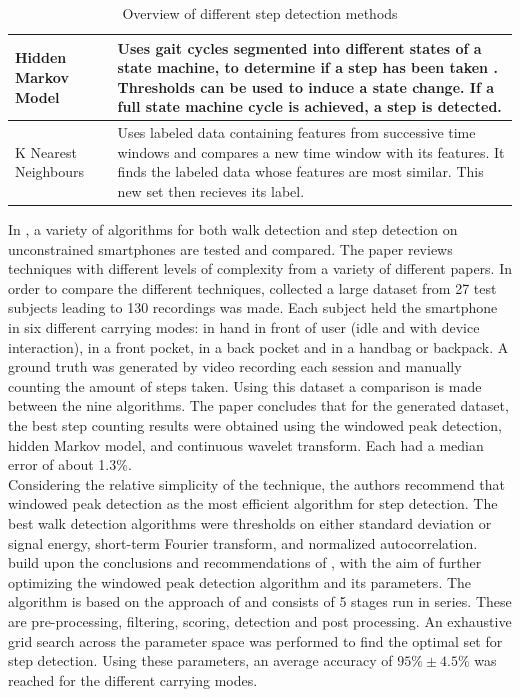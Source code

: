 \begin{table}
\begin{tabularx}{\linewidth}{@{} P{17mm} L}
		Hidden Markov Model & Uses gait cycles segmented into different states of a state machine, to determine if a step has been taken \cite{Ren2016a}. Thresholds can be used to induce a state change. If a full state machine cycle is achieved, a step is detected.\\ \hline
		K Nearest Neighbours & Uses labeled data containing features from successive time windows and compares a new time window with its features. It finds the labeled data whose features are most similar. This new set then recieves its label. \\
		\bottomrule
	\end{tabularx}
	\caption{Overview of different step detection methods}
	\label{tab:step_detection_comparison}
\end{table}

In \cite{Brajdic2013}, a variety of algorithms for both walk detection and step detection on unconstrained smartphones are tested and compared. The paper reviews techniques with different levels of complexity from a variety of different papers. In order to compare the different techniques, \citet{Brajdic2013} collected a large dataset from 27 test subjects leading to 130 recordings was made. Each subject held the smartphone in six different carrying modes: in 
hand in front of user (idle and with device interaction), in a front pocket, in a back pocket and in a handbag or backpack. A ground truth was generated by video recording each session and manually counting the amount of steps taken. Using this dataset a comparison is made between the nine algorithms.
\newline
The paper concludes that for the generated dataset, the best step counting results were obtained using the windowed peak detection, hidden Markov model, and continuous wavelet transform. Each had a median error of about 1.3\%.\\
Considering the relative simplicity of the technique, the authors recommend that windowed peak detection as the most efficient algorithm for step detection. The best walk detection algorithms were thresholds on either standard deviation or signal energy,  short-term Fourier transform, and normalized autocorrelation.\\
\citet{Salvi2018} build upon the conclusions and recommendations of \citet{Brajdic2013}, with the aim of further optimizing the windowed peak detection algorithm and its parameters. The algorithm is based on the approach of \citet{Palshikar2009} and consists of 5 stages run in series. These are pre-processing, filtering, scoring, detection and post processing. An exhaustive grid search across the parameter space was performed to find the optimal set for step detection. Using these parameters, an average accuracy of $95\% \pm 4.5\%$ was reached for the different carrying modes. 

